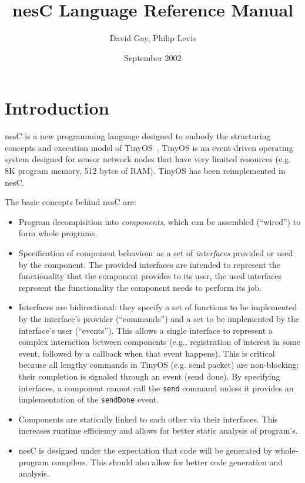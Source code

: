 \documentclass[11pt]{article}
\newcommand{\nesc}{nesC\xspace}
\begin{document}
\title{\nesc Language Reference Manual}
\author{David Gay, Philip Levis}
\date{September 2002}

\maketitle

\section{Introduction}

\nesc is a new programming language designed to embody the structuring
concepts and execution model of TinyOS~\cite{tinyos}. TinyOS is an
event-driven operating system designed for sensor network nodes that
have very limited resources (e.g. 8K program memory, 512 bytes of
RAM). TinyOS has been reimplemented in \nesc.

The basic concepts behind \nesc are:
\begin{itemize}
\item Program decompisition into \emph{components}, which can be assembled
(``wired'') to form whole programs.
\item Specification of component behaviour as a set of \emph{interfaces}
provided or used by the component. The provided interfaces are intended
to represent the functionality that the component provides to its user,
the used interfaces represent the functionality the component needs to
perform its job.
\item Interfaces are bidirectional: they specify a set of functions to be
implemented by the interface's provider (``commands'') and a set to be
implemented by the interface's user (``events''). This allows a single
interface to represent a complex interaction between components (e.g.,
registration of interest in some event, followed by a callback when
that event happens). This is critical because all lengthy commands in
TinyOS (e.g. send packet) are non-blocking; their completion is
signaled through an event (send done). By specifying interfaces, a
component cannot call the {\tt send} command unless it provides an
implementation of the {\tt sendDone} event.
\item Components are statically linked to each other via their interfaces.
This increases runtime efficiency and allows for better static analysis of 
program's.
\item \nesc is designed under the expectation that code will be generated
by whole-program compilers. This should also allow for better code 
generation and analysis.
\end{itemize}
\end{document}
